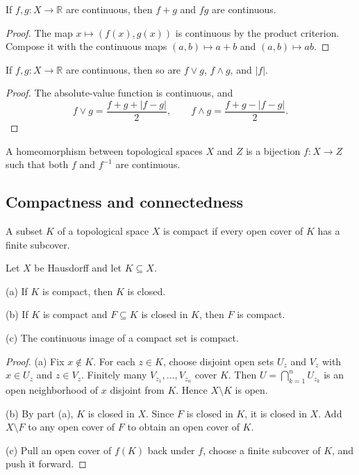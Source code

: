 \begin{thm}
If $f,g:X\to\mathbb{R}$ are continuous, then $f+g$ and $fg$ are continuous.
\end{thm}

\begin{proof}
The map $x\mapsto(f(x),g(x))$ is continuous by the product criterion. Compose
it with the continuous maps $(a,b)\mapsto a+b$ and $(a,b)\mapsto ab$.
\end{proof}

\begin{thm}
If $f,g:X\to\mathbb{R}$ are continuous, then so are
$f\vee g$, $f\wedge g$, and $|f|$.
\end{thm}

\begin{proof}
The absolute-value function is continuous, and
\[
f\vee g=\frac{f+g+|f-g|}{2},\qquad
f\wedge g=\frac{f+g-|f-g|}{2}.
\]
\end{proof}

\begin{de}
A homeomorphism between topological spaces $X$ and $Z$ is a bijection
$f:X\to Z$ such that both $f$ and $f^{-1}$ are continuous.
\end{de}

\subsection{Compactness and connectedness}

\begin{de}
A subset $K$ of a topological space $X$ is compact if every open cover of
$K$ has a finite subcover.
\end{de}

\begin{thm}
Let $X$ be Hausdorff and let $K\subseteq X$.

(a) If $K$ is compact, then $K$ is closed.

(b) If $K$ is compact and $F\subseteq K$ is closed in $K$, then $F$ is
compact.

(c) The continuous image of a compact set is compact.
\end{thm}

\begin{proof}
(a) Fix $x\notin K$. For each $z\in K$, choose disjoint open sets $U_z$ and
$V_z$ with $x\in U_z$ and $z\in V_z$. Finitely many $V_{z_1},\ldots,V_{z_n}$
cover $K$. Then $U=\bigcap_{k=1}^nU_{z_k}$ is an open neighborhood of $x$
disjoint from $K$. Hence $X\setminus K$ is open.

(b) By part (a), $K$ is closed in $X$. Since $F$ is closed in $K$, it is
closed in $X$. Add $X\setminus F$ to any open cover of $F$ to obtain an open
cover of $K$.

(c) Pull an open cover of $f(K)$ back under $f$, choose a finite subcover of
$K$, and push it forward.
\end{proof}

